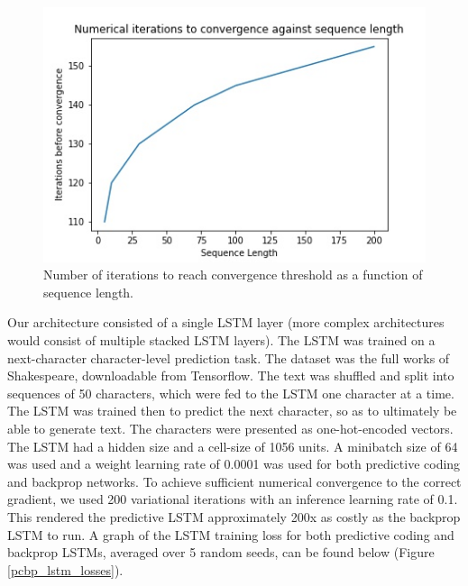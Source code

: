\begin{figure}[ht]
  \centering
  \includegraphics[width=.9\linewidth]{chapter_6_figures/convergence_num_iterations_comparison.jpg}  
\caption{Number of iterations to reach convergence threshold as a function of sequence length.}
\label{num_iterations_to_converge}
\end{figure}

Our architecture consisted of a single LSTM layer (more complex architectures would consist of multiple stacked LSTM layers).
The LSTM was trained on a next-character character-level prediction task. The dataset was the full works of Shakespeare, downloadable from Tensorflow. The text was shuffled and split into sequences of 50 characters, which were fed to the LSTM one character at a time. The LSTM was trained then to predict the next character, so as to ultimately be able to generate text. The characters were presented as one-hot-encoded vectors. The LSTM had a hidden size and a cell-size of 1056 units. A minibatch size of 64 was used and a weight learning rate of 0.0001 was used for both predictive coding and backprop networks. To achieve sufficient numerical convergence to the correct gradient, we used 200 variational iterations with an inference learning rate of 0.1. This rendered the predictive LSTM approximately 200x as costly as the backprop LSTM to run. A graph of the LSTM training loss for both predictive coding and backprop LSTMs, averaged over 5 random seeds, can be found below (Figure \ref{pcbp_lstm_losses}). 

